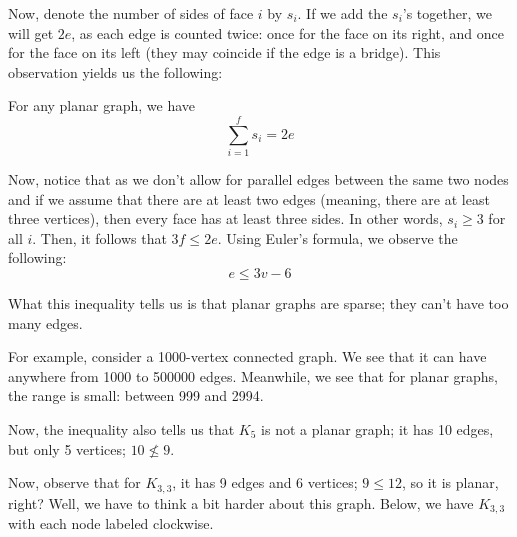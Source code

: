 \documentclass[openany]{book}
\let\oldsum\sum
\renewcommand{\sum}[2]{\oldsum\limits_{#1}^{#2}}
\begin{document}
Now, denote the number of sides of face $i$ by $s_{i}$. If we add the $s_{i}$'s together, we will get $2e$, as each edge is counted twice: once for the face on its right, and once for the face on its left (they may coincide if the edge is a bridge). This observation yields us the following:
\begin{thm}
	For any planar graph, we have
	\begin{equation*}
		\sum{i=1}{f} s_{i} = 2e
	\end{equation*}
\end{thm}

Now, notice that as we don't allow for parallel edges between the same two nodes and if we assume that there are at least two edges (meaning, there are at least three vertices), then every face has at least three sides. In other words, $s_{i} \geq 3$ for all $i$. Then, it follows that $3f \leq 2e$. Using Euler's formula, we observe the following:
\begin{equation*}
	e \leq 	3v - 6
\end{equation*}

What this inequality tells us is that planar graphs are sparse; they can't have too many edges.
\begin{example}
	For example, consider a 1000-vertex connected graph. We see that it can have anywhere from 1000 to 500000 edges. Meanwhile, we see that for planar graphs, the range is small: between 999 and 2994.
\end{example}

Now, the inequality also tells us that $K_{5}$ is not a planar graph; it has 10 edges, but only 5 vertices; $10 \not\leq 9$.

Now, observe that for $K_{3,3}$, it has 9 edges and 6 vertices; $9 \leq 12$, so it is planar, right? Well, we have to think a bit harder about this graph. Below, we have $K_{3,3}$ with each node labeled clockwise.
\begin{center}
\end{center}
\end{document}
